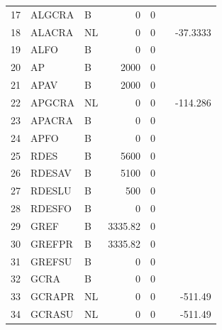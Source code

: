 \documentclass[a4paper,10pt]{article}
\begin{document}
\begin{center}
\begin{tabular}{| l  l  l  r  r  c  r |}
     17 &   ALGCRA &         B &                0 &               0 &                &		\\                
     18 &   ALACRA &         NL &               0 &               0 &                 &     -37.3333 \\ 
     19 &   ALFO &           B &                0 &               0 &                &		\\ \hline                       
     20 &   AP &             B &             2000 &               0 &                &		\\                
     21 &   APAV &           B &             2000 &               0 &                &		\\                
     22 &   APGCRA &         NL &               0 &               0 &                 &     -114.286 \\ 
     23 &   APACRA &         B &                0 &               0 &                &		\\                
     24 &   APFO &           B &                0 &               0 &                &		\\ \hline        
     25 &   RDES &           B &             5600 &               0 &                &		\\                
     26 &   RDESAV &         B &             5100 &               0 &                &		\\                
     27 &   RDESLU &         B &              500 &               0 &                &		\\                
     28 &   RDESFO &         B &                0 &               0 &                &		\\ \hline                        
     29 &   GREF &           B &          3335.82 &               0 &                &		\\                
     30 &   GREFPR &         B &          3335.82 &               0 &                &		\\                
     31 &   GREFSU &         B &                0 &               0 &                &		\\ \hline          
     32 &   GCRA &           B &                0 &               0 &                &		\\                
     33 &   GCRAPR &         NL &               0 &               0 &                 &      -511.49 \\ 
     34 &   GCRASU &         NL &               0 &               0 &                 &      -511.49 \\ \hline        

\end{tabular}
\end{center}
\end{document}
